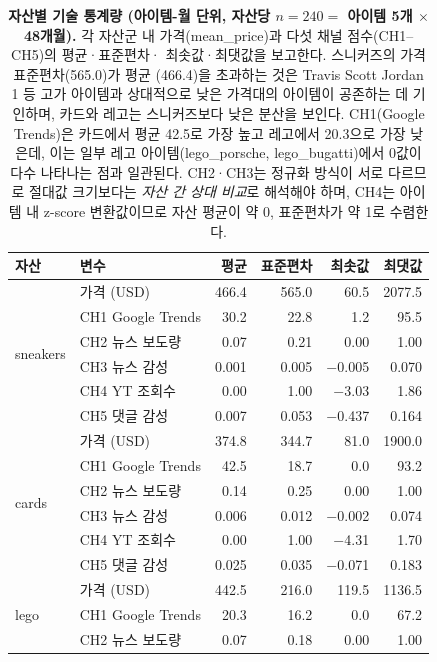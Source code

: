 \documentclass[11pt, a4paper, twocolumn]{article}
\begin{document}
\begin{table}[!tbp]
\centering\small
\caption[자산별 기술 통계]{\textbf{자산별 기술 통계량 (아이템-월
단위, 자산당 $n=240=$ 아이템 5개 $\times$ 48개월).} 각 자산군 내
가격(\textsf{mean\_price})과 다섯 채널 점수(CH1--CH5)의 평균·표준편차·
최솟값·최댓값을 보고한다. 스니커즈의 가격 표준편차(565.0)가 평균
(466.4)을 초과하는 것은 Travis Scott Jordan 1 등 고가 아이템과
상대적으로 낮은 가격대의 아이템이 공존하는 데 기인하며, 카드와 레고는
스니커즈보다 낮은 분산을 보인다. CH1(Google Trends)은 카드에서 평균
42.5로 가장 높고 레고에서 20.3으로 가장 낮은데, 이는 일부 레고
아이템(\textsf{lego\_porsche}, \textsf{lego\_bugatti})에서 0값이 다수
나타나는 점과 일관된다. CH2·CH3는 정규화 방식이 서로 다르므로 절대값
크기보다는 \emph{자산 간 상대 비교}로 해석해야 하며, CH4는 아이템 내
z-score 변환값이므로 자산 평균이 약 0, 표준편차가 약 1로 수렴한다.}
\label{tab:descriptive}
\begin{tabular}{llrrrr}
\toprule
자산 & 변수 & 평균 & 표준편차 & 최솟값 & 최댓값 \\
\midrule
\multirow{6}{*}{sneakers}
 & 가격 (USD)        & 466.4  & 565.0  &  60.5  & 2077.5 \\
 & CH1 Google Trends &  30.2  &  22.8  &   1.2  &   95.5 \\
 & CH2 뉴스 보도량   &   0.07 &   0.21 &   0.00 &    1.00 \\
 & CH3 뉴스 감성     &   0.001 &  0.005 &  $-$0.005 & 0.070 \\
 & CH4 YT 조회수     &   0.00 &   1.00 &  $-$3.03 &  1.86 \\
 & CH5 댓글 감성     &   0.007 &  0.053 &  $-$0.437 & 0.164 \\
\midrule
\multirow{6}{*}{cards}
 & 가격 (USD)        & 374.8  & 344.7  &  81.0  & 1900.0 \\
 & CH1 Google Trends &  42.5  &  18.7  &   0.0  &   93.2 \\
 & CH2 뉴스 보도량   &   0.14 &   0.25 &   0.00 &    1.00 \\
 & CH3 뉴스 감성     &   0.006 &  0.012 &  $-$0.002 & 0.074 \\
 & CH4 YT 조회수     &   0.00 &   1.00 &  $-$4.31 &  1.70 \\
 & CH5 댓글 감성     &   0.025 &  0.035 &  $-$0.071 & 0.183 \\
\midrule
\multirow{6}{*}{lego}
 & 가격 (USD)        & 442.5  & 216.0  & 119.5  & 1136.5 \\
 & CH1 Google Trends &  20.3  &  16.2  &   0.0  &   67.2 \\
 & CH2 뉴스 보도량   &   0.07 &   0.18 &   0.00 &    1.00 \\

\end{tabular}
\end{table}
\end{document}
